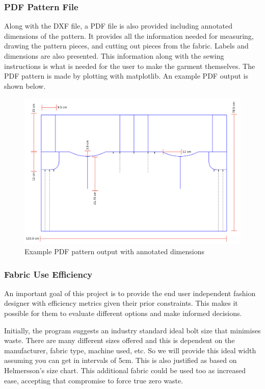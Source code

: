 \subsubsection{PDF Pattern File}
Along with the DXF file, a PDF file is also provided including annotated dimensions of the pattern. It provides all the information needed for measuring, drawing the pattern pieces, and cutting out pieces from the fabric. Labels and dimensions are also presented. This information along with the sewing instructions is what is needed for the user to make the garment themselves. The PDF pattern is made by plotting with matplotlib. An example PDF output is shown below.
\begin{figure} [H]
    \centering
    \includegraphics[width = \textwidth]{Images/example pdf output.png}
    \caption{Example PDF pattern output with annotated dimensions}
    \label{fig:pdf output}
\end{figure}


\subsubsection{Fabric Use Efficiency}
An important goal of this project is to provide the end user independent fashion designer with efficiency metrics given their prior constraints. This makes it possible for them to evaluate different options and make informed decisions.

Initially, the program suggests an industry standard ideal bolt size that minimises waste. There are many different sizes offered and this is dependent on the manufacturer, fabric type, machine used, etc. So we will provide this ideal width assuming you can get in intervals of 5cm. This is also justified as based on Helmersson's size chart. This additional fabric could be used too as increased ease, accepting that compromise to force true zero waste.


